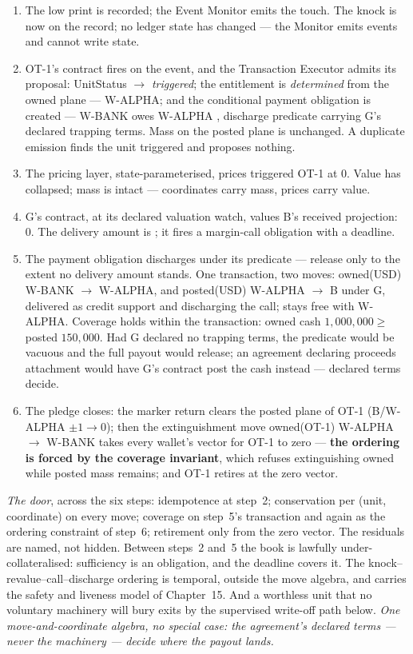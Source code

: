 \begin{enumerate}[label=\textbf{\arabic*.},nosep,itemsep=2pt]
\item The low print is recorded; the Event Monitor emits the touch. The knock
is now on the record; no ledger state has changed --- the Monitor emits
events and cannot write state.
\item OT-1's contract fires on the event, and the Transaction Executor admits
its proposal: UnitStatus $\to$ \emph{triggered}; the entitlement is
\emph{determined} from the owned plane --- W-ALPHA; and the conditional
payment obligation is created --- W-BANK owes W-ALPHA ,
discharge predicate carrying G's declared trapping terms. Mass on the posted
plane is unchanged. A duplicate emission finds the unit triggered and proposes
nothing.
\item The pricing layer, state-parameterised, prices triggered OT-1 at 0.
Value has collapsed; mass is intact --- coordinates carry mass, prices carry
value.
\item G's contract, at its declared valuation watch, values B's received
projection: 0. The delivery amount is ; it fires a margin-call
obligation with a deadline.
\item The payment obligation discharges under its predicate --- release only
to the extent no delivery amount stands. One transaction, two moves:
owned(USD)  W-BANK $\to$ W-ALPHA, and posted(USD)
 W-ALPHA $\to$ B under G, delivered as credit support and
discharging the call;  stays free with W-ALPHA. Coverage holds
within the transaction: owned cash $1{,}000{,}000 \ge$ posted $150{,}000$.
Had G declared no trapping terms, the predicate would be vacuous and the full
payout would release; an agreement declaring proceeds attachment would have
G's contract post the cash instead --- declared terms decide.
\item The pledge closes: the marker return clears the posted plane of OT-1
(B/W-ALPHA $\pm 1 \to 0$); then the extinguishment move owned(OT-1) W-ALPHA
$\to$ W-BANK takes every wallet's vector for OT-1 to zero --- \textbf{the
ordering is forced by the coverage invariant}, which refuses extinguishing
owned while posted mass remains; and OT-1 retires at the zero vector.
\end{enumerate}

\emph{The door}, across the six steps: idempotence at step~2; conservation per
(unit, coordinate) on every move; coverage on step~5's transaction and again
as the ordering constraint of step~6; retirement only from the zero vector.
The residuals are named, not hidden. Between steps~2 and~5 the book is
lawfully under-collateralised: sufficiency is an obligation, and the deadline
covers it. The knock--revalue--call--discharge ordering is temporal, outside
the move algebra, and carries the safety and liveness model of Chapter~15.
And a worthless unit that no voluntary machinery will bury exits by the
supervised write-off path below.
\emph{One move-and-coordinate algebra, no special case: the agreement's
declared terms --- never the machinery --- decide where the payout lands.}

